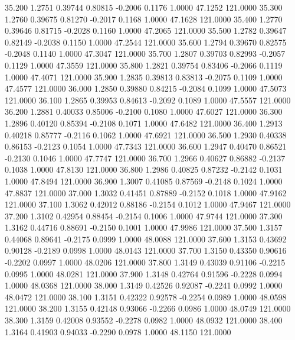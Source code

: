   35.200   1.2751   0.39744   0.80815  -0.2006   0.1176   1.0000  47.1252 121.0000
  35.300   1.2760   0.39675   0.81270  -0.2017   0.1168   1.0000  47.1628 121.0000
  35.400   1.2770   0.39646   0.81715  -0.2028   0.1160   1.0000  47.2065 121.0000
  35.500   1.2782   0.39647   0.82149  -0.2038   0.1150   1.0000  47.2544 121.0000
  35.600   1.2794   0.39670   0.82575  -0.2048   0.1140   1.0000  47.3047 121.0000
  35.700   1.2807   0.39703   0.82993  -0.2057   0.1129   1.0000  47.3559 121.0000
  35.800   1.2821   0.39754   0.83406  -0.2066   0.1119   1.0000  47.4071 121.0000
  35.900   1.2835   0.39813   0.83813  -0.2075   0.1109   1.0000  47.4577 121.0000
  36.000   1.2850   0.39880   0.84215  -0.2084   0.1099   1.0000  47.5073 121.0000
  36.100   1.2865   0.39953   0.84613  -0.2092   0.1089   1.0000  47.5557 121.0000
  36.200   1.2881   0.40033   0.85006  -0.2100   0.1080   1.0000  47.6027 121.0000
  36.300   1.2896   0.40120   0.85394  -0.2108   0.1071   1.0000  47.6482 121.0000
  36.400   1.2913   0.40218   0.85777  -0.2116   0.1062   1.0000  47.6921 121.0000
  36.500   1.2930   0.40338   0.86153  -0.2123   0.1054   1.0000  47.7343 121.0000
  36.600   1.2947   0.40470   0.86521  -0.2130   0.1046   1.0000  47.7747 121.0000
  36.700   1.2966   0.40627   0.86882  -0.2137   0.1038   1.0000  47.8130 121.0000
  36.800   1.2986   0.40825   0.87232  -0.2142   0.1031   1.0000  47.8494 121.0000
  36.900   1.3007   0.41085   0.87569  -0.2148   0.1024   1.0000  47.8837 121.0000
  37.000   1.3032   0.41451   0.87889  -0.2152   0.1018   1.0000  47.9162 121.0000
  37.100   1.3062   0.42012   0.88186  -0.2154   0.1012   1.0000  47.9467 121.0000
  37.200   1.3102   0.42954   0.88454  -0.2154   0.1006   1.0000  47.9744 121.0000
  37.300   1.3162   0.44716   0.88691  -0.2150   0.1001   1.0000  47.9986 121.0000
  37.500   1.3157   0.44068   0.89641  -0.2175   0.0999   1.0000  48.0088 121.0000
  37.600   1.3153   0.43692   0.90128  -0.2189   0.0998   1.0000  48.0143 121.0000
  37.700   1.3150   0.43350   0.90616  -0.2202   0.0997   1.0000  48.0206 121.0000
  37.800   1.3149   0.43039   0.91106  -0.2215   0.0995   1.0000  48.0281 121.0000
  37.900   1.3148   0.42764   0.91596  -0.2228   0.0994   1.0000  48.0368 121.0000
  38.000   1.3149   0.42526   0.92087  -0.2241   0.0992   1.0000  48.0472 121.0000
  38.100   1.3151   0.42322   0.92578  -0.2254   0.0989   1.0000  48.0598 121.0000
  38.200   1.3155   0.42148   0.93066  -0.2266   0.0986   1.0000  48.0749 121.0000
  38.300   1.3159   0.42008   0.93552  -0.2278   0.0982   1.0000  48.0932 121.0000
  38.400   1.3164   0.41903   0.94033  -0.2290   0.0978   1.0000  48.1150 121.0000

